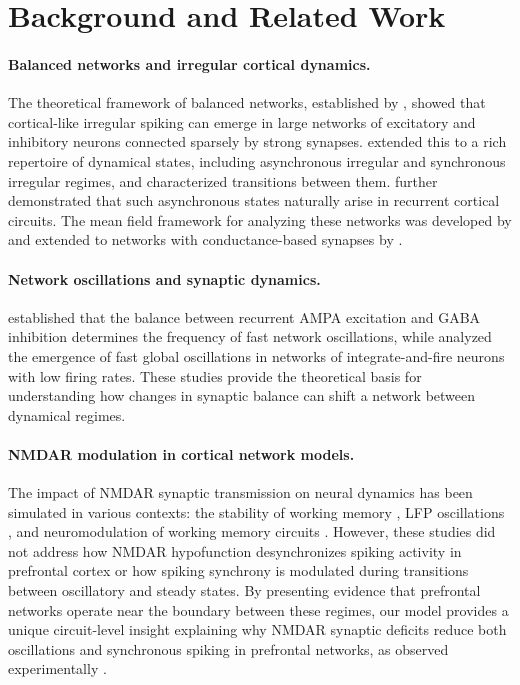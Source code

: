 \documentclass[10pt]{article}
\begin{document}
\section{Background and Related Work}

\paragraph{Balanced networks and irregular cortical dynamics.}
The theoretical framework of balanced networks, established by
\citet{vanvreeswijk1996chaos}, showed that cortical-like irregular spiking can
emerge in large networks of excitatory and inhibitory neurons connected sparsely
by strong synapses. \citet{brunel2000dynamics} extended this to a rich
repertoire of dynamical states, including asynchronous irregular and
synchronous irregular regimes, and characterized transitions between them.
\citet{renart2010asynchronous} further demonstrated that such asynchronous
states naturally arise in recurrent cortical circuits. The mean field
framework for analyzing these networks was developed by
\citet{amit1997model, brunel2000dynamics} and extended to networks with
conductance-based synapses by \citet{brunel2001effects}.

\paragraph{Network oscillations and synaptic dynamics.}
\citet{brunel2003fast} established that the balance between recurrent AMPA
excitation and GABA inhibition determines the frequency of fast network
oscillations, while \citet{brunel1999fast} analyzed the emergence of fast
global oscillations in networks of integrate-and-fire neurons with low firing
rates. These studies provide the theoretical basis for understanding how
changes in synaptic balance can shift a network between dynamical regimes.

\paragraph{NMDAR modulation in cortical network models.}
The impact of NMDAR synaptic transmission on neural dynamics has been
simulated in various contexts: the stability of working memory
\citep{wang1999synaptic, compte2000synaptic}, LFP oscillations
\citep{brunel2003fast}, and neuromodulation of working memory circuits
\citep{brunel2001effects}. However, these studies did not address how NMDAR
hypofunction desynchronizes spiking activity in prefrontal cortex or how
spiking synchrony is modulated during transitions between oscillatory and
steady states. By presenting evidence that prefrontal networks operate near
the boundary between these regimes, our model provides a unique circuit-level
insight explaining why NMDAR synaptic deficits reduce both oscillations and
synchronous spiking in prefrontal networks, as observed experimentally
\citep{zick2018blocking}.
\end{document}
